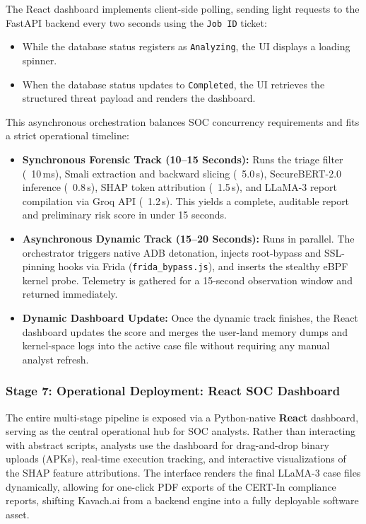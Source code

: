 \documentclass[10pt,a4paper]{article}
\begin{document}
The React dashboard implements client-side polling, sending light requests to the FastAPI backend every two seconds using the \texttt{Job ID} ticket:
\begin{itemize}
  \item While the database status registers as \texttt{Analyzing}, the UI displays a loading spinner.
  \item When the database status updates to \texttt{Completed}, the UI retrieves the structured threat payload and renders the dashboard.
\end{itemize}

This asynchronous orchestration balances SOC concurrency requirements and fits a strict operational timeline:
\begin{itemize}
  \item \textbf{Synchronous Forensic Track (10--15 Seconds):} Runs the triage filter (~10\,ms), Smali extraction and backward slicing (~5.0\,s), SecureBERT-2.0 inference (~0.8\,s), SHAP token attribution (~1.5\,s), and LLaMA-3 report compilation via Groq API (~1.2\,s). This yields a complete, auditable report and preliminary risk score in under 15 seconds.
  \item \textbf{Asynchronous Dynamic Track (15--20 Seconds):} Runs in parallel. The orchestrator triggers native ADB detonation, injects root-bypass and SSL-pinning hooks via Frida (\texttt{frida\_bypass.js}), and inserts the stealthy eBPF kernel probe. Telemetry is gathered for a 15-second observation window and returned immediately.
  \item \textbf{Dynamic Dashboard Update:} Once the dynamic track finishes, the React dashboard updates the score and merges the user-land memory dumps and kernel-space logs into the active case file without requiring any manual analyst refresh.
\end{itemize}

\subsubsection*{Stage 7: Operational Deployment: React SOC Dashboard}
The entire multi-stage pipeline is exposed via a Python-native \textbf{React} dashboard, serving as the central operational hub for SOC analysts. Rather than interacting with abstract scripts, analysts use the dashboard for drag-and-drop binary uploads (APKs), real-time execution tracking, and interactive visualizations of the SHAP feature attributions. The interface renders the final LLaMA-3 case files dynamically, allowing for one-click PDF exports of the CERT-In compliance reports, shifting Kavach.ai from a backend engine into a fully deployable software asset.
\end{document}
